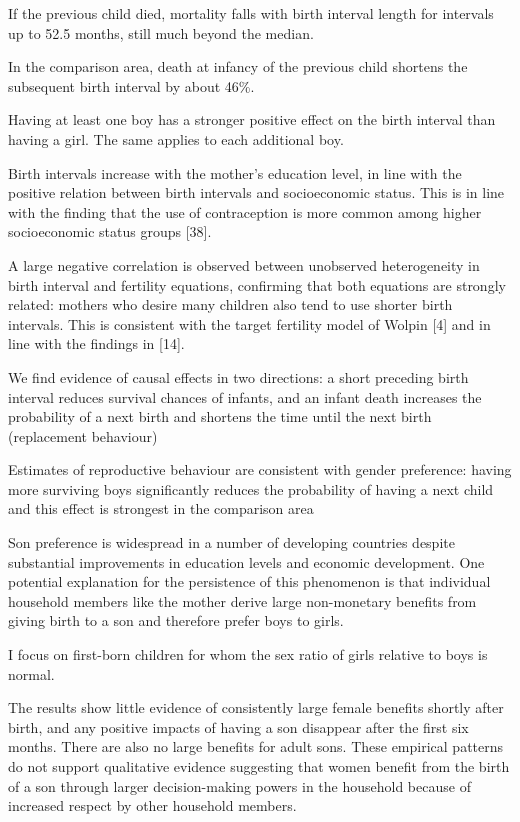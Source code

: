 If the previous child died, mortality falls with birth interval length
for intervals up to 52.5 months, still much beyond the median.

In the comparison area, death at infancy of the previous child shortens
the subsequent birth interval by about 46\%.

Having at least one boy has a stronger positive effect on the birth
interval than having a girl. The same applies to each additional boy.

Birth intervals increase with the mother’s education level, in line with
the positive relation between birth intervals and socioeconomic status.
This is in line with the finding that the use of contraception is more
common among higher socioeconomic status groups [38].

A large negative correlation is observed between unobserved
heterogeneity in birth interval and fertility equations, confirming that
both equations are strongly related: mothers who desire many children
also tend to use shorter birth intervals. This is consistent with the
target fertility model of Wolpin [4] and in line with the findings in
[14].

We find evidence of causal effects in two directions: a short preceding
birth interval reduces survival chances of infants, and an infant death
increases the probability of a next birth and shortens the time until
the next birth (replacement behaviour)

Estimates of reproductive behaviour are consistent with gender
preference: having more surviving boys significantly reduces the
probability of having a next child and this effect is strongest in the
comparison area

\citet{Zimmermann2018}

Son preference is widespread in a number of developing countries despite
substantial improvements in education levels and economic development.
One potential explanation for the persistence of this phenomenon is that
individual household members like the mother derive large non-monetary
beneﬁts from giving birth to a son and therefore prefer boys to girls.

I focus on ﬁrst-born children for whom the sex ratio of girls relative
to boys is normal.

The results show little evidence of consistently large female beneﬁts
shortly after birth, and any positive impacts of having a son disappear
after the ﬁrst six months. There are also no large beneﬁts for adult
sons. These empirical patterns do not support qualitative evidence
suggesting that women beneﬁt from the birth of a son through larger
decision-making powers in the household because of increased respect by
other household members.

